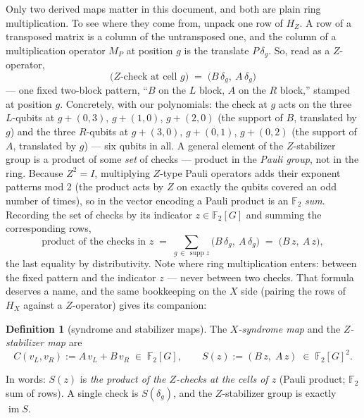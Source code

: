 \documentclass[11pt]{article}
\theoremstyle{plain}
\theoremstyle{definition}
\newtheorem{definition}[theorem]{Definition}
\theoremstyle{remark}
\newcommand{\F}{\mathbb{F}}
\newcommand{\suppop}{\operatorname{supp}}
\begin{document}
Only two derived maps matter in this document, and both are plain ring
multiplication. To see where they come from, unpack one row of $H_Z$. A row
of a transposed matrix is a column of the untransposed one, and the column
of a multiplication operator $M_P$ at position $g$ is the translate
$P\,\delta_g$. So, read as a $Z$-operator,
\[
\text{($Z$-check at cell $g$)} \;=\; \bigl(B\,\delta_g,\ A\,\delta_g\bigr)
\]
--- one fixed two-block pattern, ``$B$ on the $L$ block, $A$ on the $R$
block,'' stamped at position $g$. Concretely, with our polynomials: the check
at $g$ acts on the three $L$-qubits at $g + (0,3)$, $g + (1,0)$, $g + (2,0)$
(the support of $B$, translated by $g$) and the three $R$-qubits at
$g + (3,0)$, $g + (0,1)$, $g + (0,2)$ (the support of $A$, translated by
$g$) --- six qubits in all. A general element of the $Z$-stabilizer group is
a product of some \emph{set} of checks --- product in the \emph{Pauli
group}, not in the ring. Because $Z^2 = I$, multiplying $Z$-type Pauli
operators adds their exponent patterns mod 2 (the product acts by $Z$ on
exactly the qubits covered an odd number of times), so in the vector
encoding a Pauli product is an $\F_2$ \emph{sum}. Recording the set of
checks by its indicator $z \in \F_2[G]$ and summing the corresponding rows,
\[
\text{product of the checks in } z
\;=\; \sum_{g \,\in\, \suppop z} \bigl(B\,\delta_g,\ A\,\delta_g\bigr)
\;=\; \bigl(B\,z,\ A\,z\bigr),
\]
the last equality by distributivity. Note where ring multiplication enters:
between the fixed pattern and the indicator $z$ --- never between two
checks. That formula deserves a name, and the same bookkeeping on the $X$
side (pairing the rows of $H_X$ against a $Z$-operator) gives its companion:

\begin{definition}[syndrome and stabilizer maps]\label{def:CS}
The \emph{$X$-syndrome map} and the \emph{$Z$-stabilizer map} are
\[
C(v_L, v_R) := A\,v_L + B\,v_R \;\in\; \F_2[G],
\qquad
S(z) := (B\,z,\; A\,z) \;\in\; \F_2[G]^2 .
\]
\end{definition}

In words: $S(z)$ is \emph{the product of the $Z$-checks at the cells of $z$}
(Pauli product; $\F_2$ sum of rows). A single check is $S(\delta_g)$, and
the $Z$-stabilizer group is exactly $\operatorname{im} S$.
\end{document}
